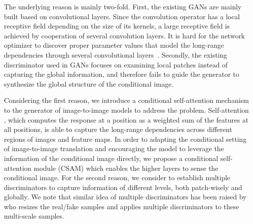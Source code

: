 The underlying reason is mainly two-fold.
%
First, the existing GANs are mainly built based on convolutional layers. Since the convolution operator has a local receptive field depending on the size of its kernels, a large receptive field is achieved by cooperation of several convolution layers. It is hard for the network optimizer to discover proper parameter values that model the long-range dependencies through several convolutional layers~\cite{SAGANs}.  
Secondly, the existing discriminator used in GANs focuses on examining local patches instead of capturing the global information, and therefore fails to guide the generator to synthesize the global structure of the conditional image. 


Considering the first reason, we introduce a conditional self-attention mechanism to the generator of image-to-image models to address the problem.
Self-attention \cite{Non-local, Attention, MachineReading, SAGANs}, which computes the response at a position as a weighted sum of the features at all positions, is able to capture the long-range dependencies across different regions of images and feature maps. In order to adapting the conditional setting of image-to-image translation and encouraging the model to leverage the information of the conditional image directly, we propose a conditional self-attention module (CSAM) which enables the higher layers to sense the conditional image. 
%
For the second reason, we consider to establish multiple discriminators to capture information of different levels, both patch-wisely and globally. We note that similar idea of multiple discriminators has been raised by \cite{LaplaceGANs, SGANs, StackGANs, CRN} who resizes the real/fake samples and applies multiple discriminators to these multi-scale samples. 




